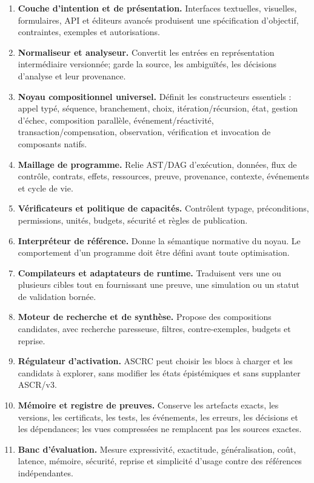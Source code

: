 \documentclass[11pt,a4paper]{article}
\begin{document}
\begin{enumerate}
\item \textbf{Couche d'intention et de présentation.} Interfaces textuelles, visuelles, formulaires, API et éditeurs avancés produisent une spécification d'objectif, contraintes, exemples et autorisations.
\item \textbf{Normaliseur et analyseur.} Convertit les entrées en représentation intermédiaire versionnée; garde la source, les ambiguïtés, les décisions d'analyse et leur provenance.
\item \textbf{Noyau compositionnel universel.} Définit les constructeurs essentiels : appel typé, séquence, branchement, choix, itération/récursion, état, gestion d'échec, composition parallèle, événement/réactivité, transaction/compensation, observation, vérification et invocation de composants natifs.
\item \textbf{Maillage de programme.} Relie AST/DAG d'exécution, données, flux de contrôle, contrats, effets, ressources, preuve, provenance, contexte, événements et cycle de vie.
\item \textbf{Vérificateurs et politique de capacités.} Contrôlent typage, préconditions, permissions, unités, budgets, sécurité et règles de publication.
\item \textbf{Interpréteur de référence.} Donne la sémantique normative du noyau. Le comportement d'un programme doit être défini avant toute optimisation.
\item \textbf{Compilateurs et adaptateurs de runtime.} Traduisent vers une ou plusieurs cibles tout en fournissant une preuve, une simulation ou un statut de validation bornée.
\item \textbf{Moteur de recherche et de synthèse.} Propose des compositions candidates, avec recherche paresseuse, filtres, contre-exemples, budgets et reprise.
\item \textbf{Régulateur d'activation.} ASCRC peut choisir les blocs à charger et les candidats à explorer, sans modifier les états épistémiques et sans supplanter ASCR/v3.
\item \textbf{Mémoire et registre de preuves.} Conserve les artefacts exacts, les versions, les certificats, les tests, les événements, les erreurs, les décisions et les dépendances; les vues compressées ne remplacent pas les sources exactes.
\item \textbf{Banc d'évaluation.} Mesure expressivité, exactitude, généralisation, coût, latence, mémoire, sécurité, reprise et simplicité d'usage contre des références indépendantes.
\end{enumerate}
\end{document}
